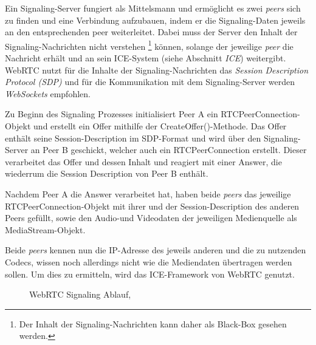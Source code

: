 Ein Signaling-Server fungiert als Mittelsmann und ermöglicht es zwei \textit{peers} sich zu finden und eine Verbindung aufzubauen, indem
er die Signaling-Daten jeweils an den entsprechenden {peer} weiterleitet.
Dabei muss der Server den Inhalt der Signaling-Nachrichten nicht verstehen
\footnote{Der Inhalt der Signaling-Nachrichten kann daher als Black-Box gesehen werden.} können, solange
der jeweilige \textit{peer} die Nachricht erhält und an sein ICE-System (siehe Abschnitt \textit{ICE}) weitergibt.
WebRTC nutzt für die Inhalte der Signaling-Nachrichten das \textit{Session Description Protocol (SDP)} und
für die Kommunikation mit dem Signaling-Server werden \textit{WebSockets} empfohlen.

Zu Beginn des Signaling Prozesses initialisiert Peer A ein RTCPeerConnection-Objekt und erstellt ein Offer mithilfe der CreateOffer()-Methode.
Das Offer enthält seine Session-Description im SDP-Format und wird über den Signaling-Server an Peer B geschickt, welcher auch ein RTCPeerConnection erstellt.
Dieser verarbeitet das Offer und dessen Inhalt und reagiert mit einer Answer, die wiederrum die Session Description von Peer B enthält.

Nachdem Peer A die Answer verarbeitet hat, haben beide \textit{peers} das jeweilige RTCPeerConnection-Objekt mit ihrer und der Session-Description des anderen
Peers gefüllt, sowie den Audio-und Videodaten der jeweiligen Medienquelle als MediaStream-Objekt.

Beide \textit{peers} kennen nun die IP-Adresse des jeweils anderen und die zu nutzenden Codecs, wissen noch allerdings nicht wie die
Mediendaten übertragen werden sollen.
Um dies zu ermitteln, wird das ICE-Framework von WebRTC genutzt.

\begin{figure}[!ht]
    \caption{WebRTC Signaling Ablauf, \parencite{SatanasGithub}}
    \label{fig:webrtc_signaling}
\end{figure}

